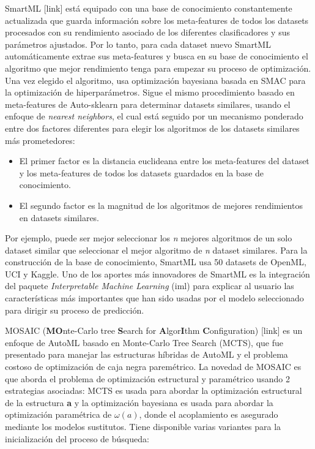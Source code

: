 SmartML [link] está equipado con una base de conocimiento constantemente actualizada que guarda información sobre los meta-features de todos los datasets procesados con su rendimiento asociado de los diferentes clasificadores y sus parámetros ajustados. Por lo tanto, para cada dataset nuevo SmartML automáticamente extrae sus meta-features y busca en su base de conocimiento el algoritmo que mejor rendimiento tenga para empezar su proceso de optimización. Una vez elegido el algoritmo, usa optimización bayesiana basada en SMAC para la optimización de hiperparámetros. Sigue el mismo procedimiento basado en meta-features de Auto-sklearn para determinar datasets similares, usando el enfoque de \textit{nearest neighbors}, el cual está seguido por un mecanismo ponderado entre dos factores diferentes para elegir los algoritmos de los datasets similares más prometedores:

\begin{itemize}
	\item El primer factor es la distancia euclideana entre los meta-features del dataset y los meta-features de todos los datasets guardados en la base de conocimiento.
	\item El segundo factor es la magnitud de los algoritmos de mejores rendimientos en datasets similares.
\end{itemize}

Por ejemplo, puede ser mejor seleccionar los \textit{n} mejores algoritmos de un solo dataset similar que seleccionar el mejor algoritmo de \textit{n} dataset similares. Para la construcción de la base de conocimiento, SmartML usa 50 datasets de OpenML, UCI y Kaggle. Uno de los aportes más innovadores de SmartML es la integración del paquete \textit{Interpretable Machine Learning} (iml) para explicar al usuario las características más importantes que han sido usadas por el modelo seleccionado para dirigir su proceso de predicción.

MOSAIC (\textbf{MO}nte-Carlo tree \textbf{S}earch for \textbf{A}lgor\textbf{I}thm \textbf{C}onfiguration) [link] es un enfoque de AutoML basado en Monte-Carlo Tree Search (MCTS), que fue presentado para manejar las estructuras híbridas de AutoML y el problema costoso de optimización de caja negra paremétrico. La novedad de MOSAIC es que aborda el problema de optimización estructural y paramétrico usando 2 estrategias asociadas: MCTS es usada para abordar la optimización estructural de la estructura \textbf{a} y la optimización bayesiana es usada para abordar la optimización paramétrica de $\omega(a)$, donde el acoplamiento es asegurado mediante los modelos sustitutos. Tiene disponible varias variantes para la inicialización del proceso de búsqueda:

